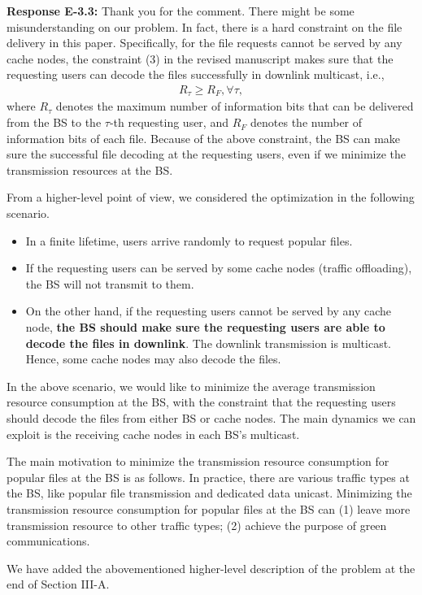 \documentclass[12pt,onecolumn]{IEEEtran}
\newcommand{\blue}{\color{blue}}
\newcommand{\spaceblank}{\vskip 4mm}
\begin{document}
{\blue \textbf{Response E-3.3:} 
Thank you for the comment. There might be some misunderstanding on our problem. 
	In fact, there is a hard constraint on the file delivery in this paper. Specifically, for the file requests cannot be served by any cache nodes, the constraint (3) in the revised manuscript makes sure that the requesting users can decode the files successfully in downlink multicast, i.e.,
	\begin{align}
	R_{\tau}\geq R_F, \forall \tau,
	\end{align}
	where $R_{\tau}$ denotes the maximum number of information bits that can be delivered from the BS to the $\tau$-th requesting user, and $R_F$ denotes the number of  information bits of each file. Because of the above constraint, the BS can make sure the successful file decoding at the requesting users, even if we minimize the transmission resources at the BS. 
	
From a higher-level point of view, we considered the optimization in the following scenario. 

\begin{itemize}

\item In a finite lifetime,  users arrive randomly to request popular files. 

\item If the requesting users can be served by some cache nodes (traffic offloading), the BS will not transmit to them. 

\item On the other hand, if the requesting users cannot be served by any cache node, {\bf the BS should make sure the requesting users are able to decode the files in downlink}. The downlink transmission is multicast. Hence, some cache nodes may also decode the files.




\end{itemize}


In the above scenario, we would like to minimize the average transmission resource consumption at the BS, with the constraint that the requesting users should decode the files from either BS or cache nodes. The main dynamics we can exploit is the receiving cache nodes in each BS's multicast.

The main motivation to minimize the transmission resource consumption for popular files at the BS is as follows. In practice, there are various traffic types at the BS, like popular file transmission and dedicated data unicast. Minimizing the transmission resource consumption for popular files at the BS can (1) leave more transmission resource to other traffic types; (2) achieve the purpose of green communications.

		
		We have added the abovementioned higher-level description of the problem at the end of Section III-A.
	
}
\spaceblank
{}
\end{document}
